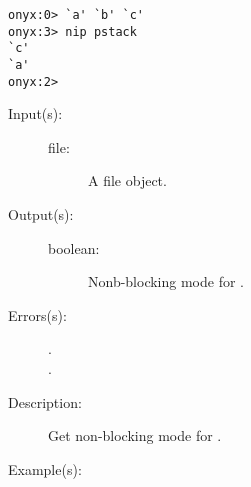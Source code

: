\begin{description}
\begin{description}
\begin{verbatim}
onyx:0> `a' `b' `c'
onyx:3> nip pstack
`c'
`a'
onyx:2>
		\end{verbatim}
	\end{description}
\label{systemdict:nonblocking}
\item[{\onyxop{file}{nonblocking}{boolean}}: ]
	\begin{description}\item[]
	\item[Input(s): ]
		\begin{description}\item[]
		\item[file: ]
			A file object.
		\end{description}
	\item[Output(s): ]
		\begin{description}\item[]
		\item[boolean: ]
			Nonb-blocking mode for .
		\end{description}
	\item[Errors(s): ]
		\begin{description}\item[]
		\item[.]
		\item[.]
		\end{description}
	\item[Description: ]
		Get non-blocking mode for .
	\item[Example(s): ]\begin{verbatim}


\end{verbatim}
\end{description}
\end{description}
